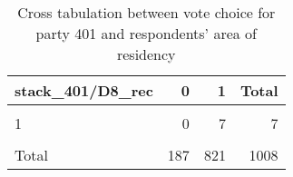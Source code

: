 \documentclass[
]{article}
\begin{document}
\begin{table}

\caption{\label{tab:unnamed-chunk-35}Cross tabulation between vote choice for party 401 and respondents' area of residency 
                  \label{table:crosstab_7_hr}}
\centering
\begin{tabular}[t]{l|r|r|r}
\hline
stack\_401/D8\_rec & 0 & 1 & Total\\
\hline
\cellcolor{gray!6}{0} & \cellcolor{gray!6}{179} & \cellcolor{gray!6}{789} & \cellcolor{gray!6}{968}\\
\hline
1 & 0 & 7 & 7\\
\hline
\cellcolor{gray!6}{NA} & \cellcolor{gray!6}{8} & \cellcolor{gray!6}{25} & \cellcolor{gray!6}{33}\\
\hline
Total & 187 & 821 & 1008\\
\hline
\end{tabular}
\end{table}
\end{document}
